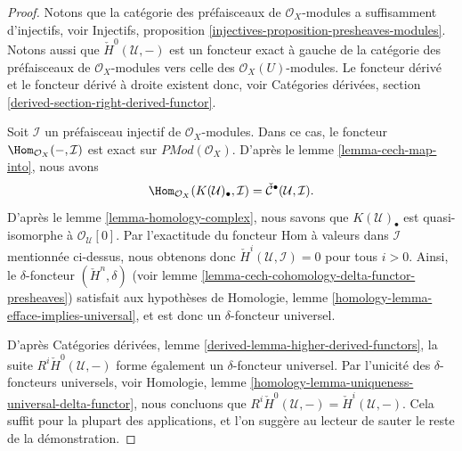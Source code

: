 \begin{proof}
Notons que la catégorie des préfaisceaux de $\mathcal{O}_X$-modules a suffisamment d'injectifs, voir Injectifs, proposition \ref{injectives-proposition-presheaves-modules}. Notons aussi que $\check{H}^0(\mathcal{U}, -)$ est un foncteur exact à gauche de la catégorie des préfaisceaux de $\mathcal{O}_X$-modules vers celle des $\mathcal{O}_X(U)$-modules. Le foncteur dérivé et le foncteur dérivé à droite existent donc, voir Catégories dérivées, section \ref{derived-section-right-derived-functor}.

\medskip\noindent

Soit $\mathcal{I}$ un préfaisceau injectif de $\mathcal{O}_X$-modules. Dans ce cas, le foncteur $\Hom_{\mathcal{O}_X}(-, \mathcal{I})$
est exact sur $\textit{PMod}(\mathcal{O}_X)$. D'après le lemme \ref{lemma-cech-map-into}, nous avons
$$
\Hom_{\mathcal{O}_X}(K(\mathcal{U})_\bullet, \mathcal{I})
=
\check{\mathcal{C}}^\bullet(\mathcal{U}, \mathcal{I}).
$$
D'après le lemme \ref{lemma-homology-complex}, nous savons que $K(\mathcal{U})_\bullet$ est quasi-isomorphe à $\mathcal{O}_\mathcal{U}[0]$. Par l'exactitude du foncteur Hom à valeurs dans $\mathcal{I}$ mentionnée ci-dessus, nous obtenons donc $\check{H}^i(\mathcal{U}, \mathcal{I}) = 0$ pour tous
$i > 0$. Ainsi, le $\delta$-foncteur $(\check{H}^n, \delta)$
(voir lemme \ref{lemma-cech-cohomology-delta-functor-presheaves}) satisfait aux hypothèses de Homologie, lemme \ref{homology-lemma-efface-implies-universal}, et est donc un $\delta$-foncteur universel.

\medskip\noindent
D'après Catégories dérivées, lemme \ref{derived-lemma-higher-derived-functors}, la suite $R^i\check{H}^0(\mathcal{U}, -)$ forme également un $\delta$-foncteur universel. Par l'unicité des $\delta$-foncteurs universels, voir Homologie, lemme \ref{homology-lemma-uniqueness-universal-delta-functor}, nous concluons que $R^i\check{H}^0(\mathcal{U}, -) = \check{H}^i(\mathcal{U}, -)$. Cela suffit pour la plupart des applications, et l'on suggère au lecteur de sauter le reste de la démonstration.

\medskip\noindent


\end{proof}
